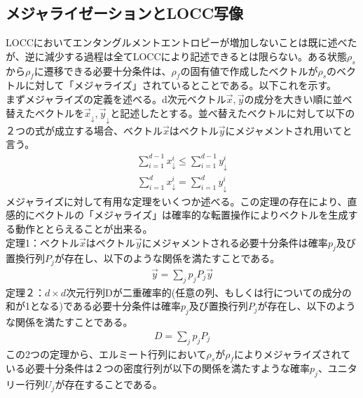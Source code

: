 \documentclass[a4paper,10.5pt]{article}
\numberwithin{equation}{section}
\begin{document}
\subsection{メジャライゼーションとLOCC写像}
LOCCにおいてエンタングルメントエントロピーが増加しないことは既に述べたが、逆に減少する過程は全てLOCCにより記述できるとは限らない。ある状態$\rho_{s}$から$\rho_{f}$に遷移できる必要十分条件は、$\rho_{f}$の固有値で作成したベクトルが$\rho_{s}$のベクトルに対して「メジャライズ」されているとことである。以下これを示す。\\
まずメジャライズの定義を述べる。d次元ベクトル$\vec{x},\vec{y}$の成分を大きい順に並べ替えたベクトルを$\vec{x}_{\downarrow},\vec{y}_{\downarrow}$と記述したとする。並べ替えたベクトルに対して以下の２つの式が成立する場合、ベクトル$\vec{x}$はベクトル$\vec{y}$にメジャメントされ用いてと言う。
\begin{equation}\begin{split}
    \sum_{i=1}^{d-1} x_{\downarrow}^{i} \leq \sum_{i=1}^{d-1} y_{\downarrow}^{i}
\end{split} \end{equation}
\begin{equation}\begin{split}
    \sum_{i=1}^{d} x_{\downarrow}^{i} = \sum_{i=1}^{d} y_{\downarrow}^{i}
\end{split} \end{equation}
メジャライズに対して有用な定理をいくつか述べる。この定理の存在により、直感的にベクトルの「メジャライズ」は確率的な転置操作によりベクトルを生成する動作ととらえることが出来る。\\
定理1：ベクトル$\vec{x}$はベクトル$\vec{y}$にメジャメントされる必要十分条件は確率$p_{j}$及び置換行列$P_{j}$が存在し、以下のような関係を満たすことである。
\begin{equation}\begin{split}
    \vec{y}=\sum_{j}p_{j}P_{j}\vec{y}
\end{split} \end{equation}
定理２：$d \times d$次元行列Dが二重確率的(任意の列、もしくは行についての成分の和が1となる)である必要十分条件は確率$p_{j}$及び置換行列$P_{j}$が存在し、以下のような関係を満たすことである。
\begin{equation}\begin{split}
    D=\sum_{j} p_{j}P_{j}
\end{split} \end{equation}
この2つの定理から、エルミート行列において$\rho_{s}$が$\rho_{f}$によりメジャライズされている必要十分条件は２つの密度行列が以下の関係を満たすような確率$p_{j}$、ユニタリー行列$U_{j}$が存在することである。
\end{document}
